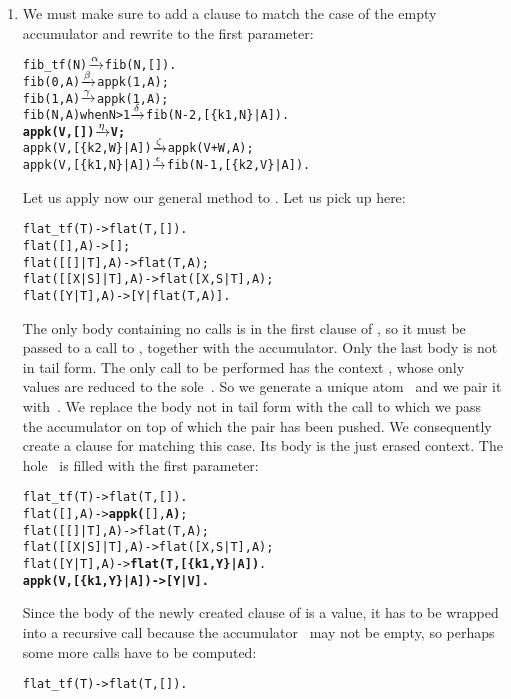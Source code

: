 \begin{enumerate}
  \item We must make sure to add a clause to match the case of the
    empty accumulator and rewrite to the first parameter:
\begin{alltt}
fib\_tf(N)           \(\smashedrightarrow{\alpha}\) fib(N,[]).
fib(0,A)            \(\smashedrightarrow{\beta}\) appk(1,A);
fib(1,A)            \(\smashedrightarrow{\gamma}\) appk(1,A);
fib(N,A) when N > 1 \(\smashedrightarrow{\delta}\) fib(N-2,[\{k1,N\}|A]).
\textbf{appk(V,        [])  \(\smashedrightarrow{\eta}\) V;}\hfill% \emph{Do not forget!}
appk(V,[\{k2,W\}|A])  \(\smashedrightarrow{\zeta}\) appk(V+W,A);
appk(V,[\{k1,N\}|A])  \(\smashedrightarrow{\epsilon}\) fib(N-1,[\{k2,V\}|A]).
\end{alltt}
Let us apply now our general method to . Let us pick
up here:
\begin{alltt}
flat\_tf(T)        -> flat(T,[]).
flat(       [],A) -> [];\hfill% A \emph{unused yet}
flat(   [[]|T],A) -> flat(T,A);
flat([[X|S]|T],A) -> flat([X,S|T],A);
flat(    [Y|T],A) -> [Y|flat(T,A)].
\end{alltt}
The only body containing no calls is in the first clause of
, so it must be passed to a call to ,
together with the accumulator. Only the last body is not in tail
form. The only call to be performed has the context
\erlcode{[Y|\textvisiblespace]}, whose only values are reduced to the
sole~. So we generate a unique atom~ and we
pair it with~. We replace the body not in tail form with
the call to which we pass the accumulator on top of which the pair has
been pushed. We consequently create a clause for 
matching this case. Its body is the just erased context. The
hole~\erlcode{\textvisiblespace} is filled with the first parameter:
\begin{alltt}
flat\_tf(T)         -> flat(T,[]).
flat(       [],A)  -> \textbf{appk(}[],\textbf{A)};
flat(   [[]|T],A)  -> flat(T,A);
flat([[X|S]|T],A)  -> flat([X,S|T],A);
flat(    [Y|T],A)  -> \textbf{flat(T,[\{k1,Y\}|A])}.
\textbf{appk(V,[\{k1,Y\}|A]) -> [Y|V].}
\end{alltt}
Since the body of the newly created clause of  is a
value, it has to be wrapped into a recursive call because the
accumulator~ may not be empty, so perhaps some more calls
have to be computed:
\begin{alltt}
flat\_tf(T)         -> flat(T,[]).

\end{alltt}
\end{enumerate}
